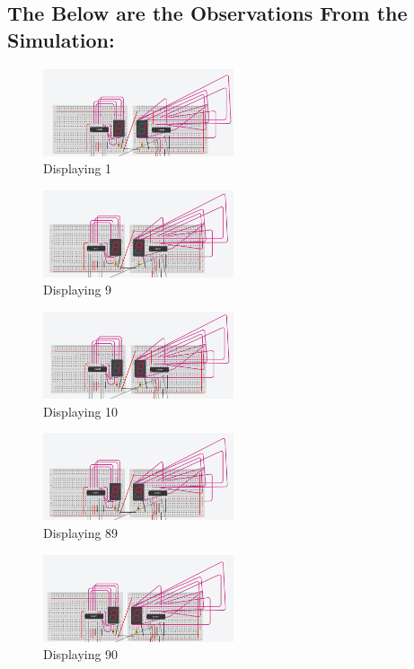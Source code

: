 \documentclass[a4paper,12pt]{article}
\begin{document}
\subsection{\textbf{The Below are the Observations From the Simulation:}}
\begin{figure}[H]
\centering    
\includegraphics[width=0.5\textwidth]{figs/1.png} 
	\caption*{Displaying 1}
\end{figure}
\begin{figure}[H]
\centering    
\includegraphics[width=0.5\textwidth]{figs/9.png} 
	\caption*{Displaying 9}
\end{figure}
\begin{figure}[H]
\centering    
\includegraphics[width=0.5\textwidth]{figs/10.png} 
	\caption*{Displaying 10}
\end{figure}
\begin{figure}[H]
\centering    
\includegraphics[width=0.5\textwidth]{figs/89.png}
	\caption*{Displaying 89}
\end{figure}
\begin{figure}[H]
\centering    
\includegraphics[width=0.5\textwidth]{figs/90.png} 
	\caption*{Displaying 90}
\end{figure}
\end{document}
